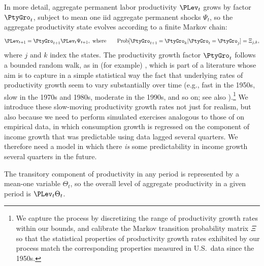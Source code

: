 In more detail, aggregate permanent labor productivity $\PLev_t$ grows by factor $\PtyGro_t$, subject to mean one iid aggregate permanent shocks $\Psi_t$, so the aggregate productivity state evolves according to a finite Markov chain:
\begin{equation}
  {\PLev}_{t+1} = \PtyGro_{t+1} {\PLev}_{t}\Psi_{t+1}, \text{ where} \qquad\text{Prob}[\PtyGro_{t+1}=\PtyGro_k | \PtyGro_t = \PtyGro_j] = \Xi_{j,k},   \label{eq:AggRandWalk}
\end{equation}
where $j$ and $k$ index the states. The productivity growth factor $\PtyGro_t$ follows a bounded random walk, as in (for example) \cite{edge2007Learning}, which is part of a literature whose aim is to capture in a simple statistical way the fact that underlying rates of productivity growth seem to vary substantially over time (e.g., fast in the 1950s, slow in the 1970s and 1980s, moderate in the 1990s, and so on; see also \cite{jorgenson:ProductivityGrowthResurgence}).\footnote{We capture the process by discretizing the range of productivity growth rates within our bounds, and calibrate the Markov transition probability matrix $\Xi$ so that the statistical properties of productivity growth rates exhibited by our process match the corresponding properties measured in U.S.\ data since the 1950s.}  We introduce these slow-moving productivity growth rates not just for realism, but also because we need to perform simulated exercises analogous to those of \cite{cmModel} on empirical data, in which consumption growth is regressed on the component of income growth that was predictable using data lagged several quarters.  We therefore need a model in which there {\it is} some predictability in income growth several quarters in the future.

The transitory component of productivity in any period is represented by a mean-one variable $\Theta_t$, so the overall level of aggregate productivity in a given period is $\PLev_{t}\Theta_{t}$.

